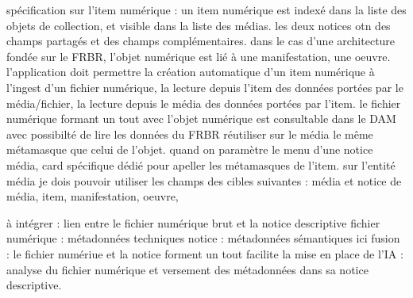 spécification sur l'item numérique : 
un item numérique est indexé dans la liste des objets de collection, et visible dans la liste des médias. les deux notices otn des champs partagés et des champs complémentaires. dans le cas d'une architecture fondée sur le FRBR, l'objet numérique est lié à une manifestation, une oeuvre. 
l'application doit permettre la création automatique d'un item numérique à l'ingest d'un fichier numérique, la lecture depuis l'item des données portées par le média/fichier, la lecture depuis le média des données portées par l'item. 
le fichier numérique formant un tout avec l'objet numérique est consultable dans le DAM avec possibilté de lire les données du FRBR
réutiliser sur le média le même métamasque que celui de l'objet. quand on paramètre le menu d'une notice média, card spécifique dédié pour apeller les métamasques de l'item. 
sur l'entité média je dois pouvoir utiliser les champs des cibles suivantes : média et notice de média, item, manifestation, oeuvre, 

à intégrer : 
lien entre le fichier numérique brut et la notice descriptive 
fichier numérique : métadonnées techniques
notice : métadonnées sémantiques 
ici fusion : le fichier numériue et la notice forment un tout 
facilite la mise en place de l'IA : analyse du fichier numérique et versement des métadonnées dans sa notice descriptive.